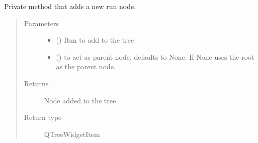 \documentclass[letterpaper,10pt,english]{sphinxmanual}
\begin{document}
\begin{fulllineitems}
\begin{fulllineitems}
\begin{quote}
\begin{description}
\end{description}\end{quote}

\end{fulllineitems}


\begin{fulllineitems}
\label{\detokenize{polo.widgets:polo.widgets.run_tree.RunTree._add_run_node}}
Private method that adds a new run node.
\begin{quote}\begin{description}
\item[{Parameters}] \leavevmode\begin{itemize}
\item {} 
 ({\hyperref[\detokenize{polo.crystallography:polo.crystallography.run.Run}]{}}) \textendash{} Run to add to the tree

\item {} 
 (\sphinxstyleliteralemphasis{\sphinxupquote{, }}) \textendash{}  to act as parent node, defaults to None.
If None uses the root as the parent node.

\end{itemize}

\item[{Returns}] \leavevmode
Node added to the tree

\item[{Return type}] \leavevmode
QTreeWidgetItem

\end{description}\end{quote}

\end{fulllineitems}



\end{fulllineitems}
\end{document}
